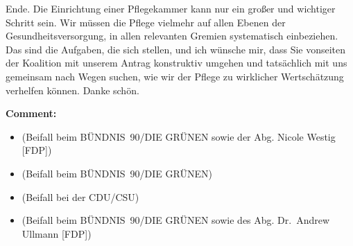 \documentclass{article}
\begin{document}
Ende. Die Einrichtung einer Pflegekammer kann nur ein großer und wichtiger Schritt sein. Wir müssen die Pflege vielmehr auf allen Ebenen der Gesundheitsversorgung, in allen relevanten Gremien systematisch einbeziehen. Das sind die Aufgaben, die sich stellen, und ich wünsche mir, dass Sie vonseiten der Koalition mit unserem Antrag konstruktiv umgehen und tatsächlich mit uns gemeinsam nach Wegen suchen, wie wir der Pflege zu wirklicher Wertschätzung verhelfen können. Danke schön.  

\noindent\textbf{Comment:}
\begin{itemize}
    \setlength\itemsep{-3pt}
    \item (Beifall beim BÜNDNIS 90/DIE GRÜNEN sowie der Abg. Nicole Westig [FDP])
    \setlength\itemsep{-3pt}
    \item (Beifall beim BÜNDNIS 90/DIE GRÜNEN)
    \setlength\itemsep{-3pt}
    \item (Beifall bei der CDU/CSU)
    \setlength\itemsep{-3pt}
    \item (Beifall beim BÜNDNIS 90/DIE GRÜNEN sowie des Abg. Dr. Andrew Ullmann [FDP])
\end{itemize}
\end{document}
